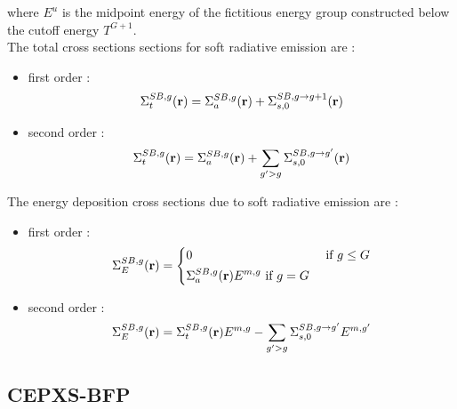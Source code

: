 where $E^u$ is the midpoint energy of the fictitious energy group constructed
below the cutoff energy $T^{G+1}$.\\
The total cross sections sections for soft radiative emission are :
\begin{itemize}
\item first order :
\begin{equation}
\Sigma_{t}^{SB,g}(\mathbf{r}) = \Sigma_{a}^{SB,g}(\mathbf{r}) + \Sigma_{s,0}^{SB,g\rightarrow
g+1}(\mathbf{r})
\end{equation}
\item second order :
\begin{equation}
\Sigma_t^{SB,g}(\mathbf{r}) = \Sigma_{a}^{SB,g}(\mathbf{r}) + \sum_{g' >
g}\Sigma_{s,0}^{SB,g\rightarrow g'}(\mathbf{r})
\end{equation}
\end{itemize}

The energy deposition cross sections due to soft radiative emission are :
\begin{itemize}
\item first order :
\begin{equation}
\Sigma_E^{SB,g}(\mathbf{r}) = 
\left\{
\begin{aligned}
& 0 & \textrm{ if } g\leq G\\
& \Sigma_a^{SB,g}(\mathbf{r}) E^{m,g} \textrm{ if } g=G
\end{aligned}
\right.
\end{equation}
\item second order :
\begin{equation}
\Sigma_E^{SB,g}(\mathbf{r}) = \Sigma_{t}^{SB,g}(\mathbf{r}) E^{m,g} - \sum_{g'>g}
\Sigma_{s,0}^{SB,g\rightarrow g'} E^{m,g'}
\end{equation}
\end{itemize}


\subsection{CEPXS-BFP}
